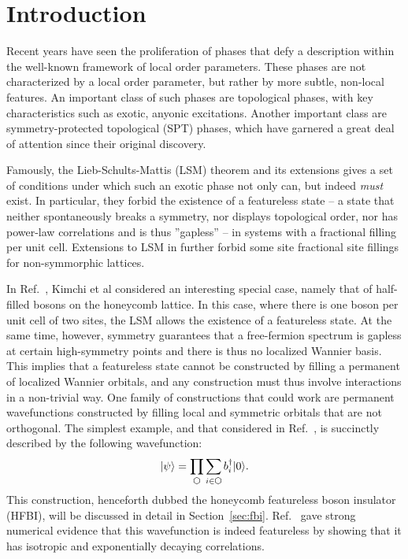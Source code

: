 
\section{Introduction}


Recent years have seen the proliferation of phases that defy a description
within the well-known framework of local order parameters. These phases are
not characterized by a local order parameter, but rather by more subtle,
non-local features. An important class of such phases are topological phases,
with key characteristics such as exotic, anyonic excitations. Another
important class are symmetry-protected topological (SPT) phases, which have
garnered a great deal of attention since their original discovery.

Famously, the Lieb-Schults-Mattis (LSM) theorem and its extensions gives a set of
conditions under which such an exotic phase not only can, but indeed \emph{must}
exist. In particular, they forbid the existence of a featureless state
-- a state that neither spontaneously breaks a symmetry, nor displays topological
order, nor has power-law correlations and is thus ''gapless'' -- in systems
with a fractional filling per unit cell. Extensions to LSM in  further
forbid some site fractional site fillings for non-symmorphic lattices.

In Ref.~, Kimchi et al considered an interesting special case, namely that of half-filled bosons on the honeycomb lattice.
In this case, where there is one boson per unit cell of two sites, the LSM allows the existence of a featureless state.
At the same time, however, symmetry guarantees that
a free-fermion spectrum is gapless at certain high-symmetry points and there is
thus no localized Wannier basis.
This implies that a featureless state cannot be constructed by filling a permanent of localized Wannier orbitals, and any construction must thus involve interactions in a non-trivial way. One family of constructions that could work are permanent wavefunctions constructed by filling local and symmetric orbitals that are not orthogonal. The simplest example, and that considered in Ref.~, is succinctly described by the following wavefunction:
\begin{equation}
\ket{\psi} = \prod\limits_{\varhexagon} \sum\limits_{i \in
\varhexagon} b^{\dagger}_{i} \ket{0}.
\end{equation}
This construction,
henceforth dubbed the honeycomb featureless boson insulator (HFBI),
will be discussed in detail in Section~\ref{sec:fbi}. Ref.~ gave strong numerical evidence that this wavefunction is indeed featureless by showing that it has isotropic and exponentially decaying correlations.

